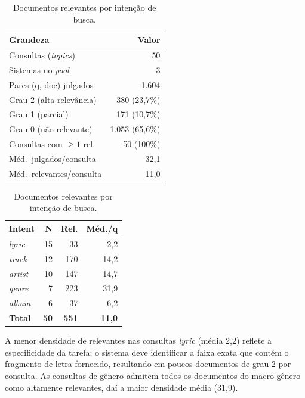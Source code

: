 \documentclass[12pt]{article}
\begin{document}
\begin{table}[ht]
\centering
\setlength{\tabcolsep}{4pt}
\begin{minipage}[t]{0.56\linewidth}
\centering
\caption{Estatísticas da coleção de referência.}
\label{tab:stats}
\small
\begin{tabular}{lr}
\toprule
\textbf{Grandeza} & \textbf{Valor} \\
\midrule
Consultas (\textit{topics})        & 50 \\
Sistemas no \textit{pool}          & 3 \\
Pares (q, doc) julgados            & 1.604 \\
Grau 2 (alta relevância)           & 380 (23{,}7\%) \\
Grau 1 (parcial)                   & 171 (10{,}7\%) \\
Grau 0 (não relevante)             & 1.053 (65{,}6\%) \\
Consultas com $\geq 1$ rel.        & 50 (100\%) \\
Méd.\ julgados/consulta            & 32{,}1 \\
Méd.\ relevantes/consulta          & 11{,}0 \\
\bottomrule
\end{tabular}
\end{minipage}\hfill
\begin{minipage}[t]{0.42\linewidth}
\centering
\caption{Documentos relevantes por intenção de busca.}
\label{tab:relintent}
\small
\begin{tabular}{lrrr}
\toprule
\textbf{Intent} & \textbf{N} & \textbf{Rel.} & \textbf{Méd./q} \\
\midrule
\textit{lyric}  & 15 & 33  & 2{,}2 \\
\textit{track}  & 12 & 170 & 14{,}2 \\
\textit{artist} & 10 & 147 & 14{,}7 \\
\textit{genre}  & 7  & 223 & 31{,}9 \\
\textit{album}  & 6  & 37  & 6{,}2 \\
\midrule
\textbf{Total}  & \textbf{50} & \textbf{551} & \textbf{11{,}0} \\
\bottomrule
\end{tabular}
\end{minipage}
\end{table}

A menor densidade de relevantes nas consultas \textit{lyric} (média 2{,}2)
reflete a especificidade da tarefa: o sistema deve identificar a faixa exata que
contém o fragmento de letra fornecido, resultando em poucos documentos de grau 2
por consulta. As consultas de gênero admitem todos os documentos do macro-gênero
como altamente relevantes, daí a maior densidade média (31{,}9).
\end{document}
